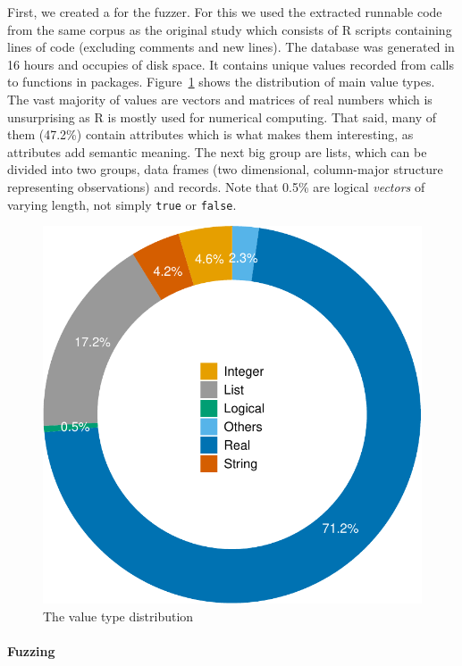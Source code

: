 \documentclass[sigplan,nonacm,anonymous,review]{acmart}
\begin{document}
First, we created a \sxpdb for the fuzzer.
For this we used the extracted runnable code from the same corpus as the original study which consists of \DBNumSourceFiles R scripts containing \DBSourceLinesOfCodeRnd lines of code (excluding comments and new lines).
The database was generated in 16 hours and occupies \DBFileSize of disk space.
It contains \DBValuesRnd unique values recorded from \DBNumCallsRnd calls to \DBNumFunctionsRnd functions in \DBNumPackages packages.
Figure~\ref{fig:argsdb-value-distribution} shows the distribution of main value types.
The vast majority of values are vectors and matrices of real numbers which is unsurprising as R is mostly used for numerical computing.
That said, many of them (47.2\%) contain attributes which is what makes them interesting, as attributes add semantic meaning.
The next big group are lists, which can be divided into two groups, data frames (two dimensional, column-major structure representing observations) and records.
Note that 0.5\% are logical \textit{vectors} of varying length, not simply {\tt true} or {\tt false}. 

\begin{figure}
    \centering
    \includegraphics[width=.6\columnwidth]{code-and-figures/argsdb-value-distribution.pdf}
    \vspace{-3mm}
    \caption{The \sxpdb value type distribution}
    \label{fig:argsdb-value-distribution}
\end{figure}

\paragraph{Fuzzing}
\end{document}
